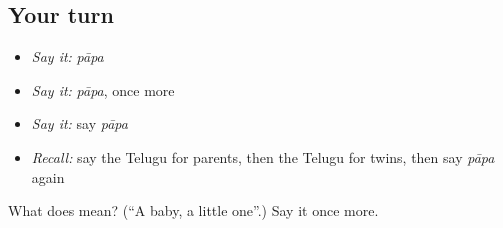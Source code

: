 \subsection*{Your turn}
\begin{itemize}
\raggedright
  \item \emph{Say it:} \emph{pāpa}
  \item \emph{Say it:} \emph{pāpa}, once more
  \item \emph{Say it:} say \emph{pāpa}
  \item \emph{Recall:} say the Telugu for parents, then the Telugu for twins, then say \emph{pāpa} again
\end{itemize}

\begin{tcolorbox}[breakable,colback=teal!4,colframe=teal!35!black,title={Before you move on}]
What does  mean? (\textquotedblleft{}A baby, a little one\textquotedblright{}.) Say it once more.
\end{tcolorbox}
